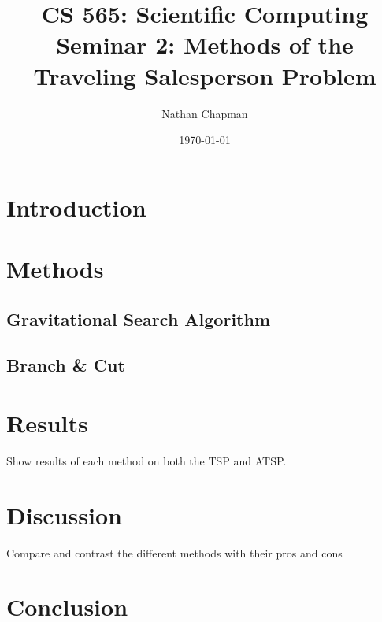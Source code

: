 \documentclass{article}
\title{\vspace*{-0.625in}CS 565: Scientific Computing \\ Seminar 2: Methods of the Traveling Salesperson Problem}
\author{Nathan Chapman}
\date{\today}
\begin{document}
    \maketitle

    \section*{Introduction}

    \section*{Methods}

        \subsection*{Gravitational Search Algorithm}

        \subsection*{Branch \& Cut}

    \section*{Results}

        Show results of each method on both the TSP and ATSP.

    \section*{Discussion}

        Compare and contrast the different methods with their pros and cons

    \section*{Conclusion}
\end{document}
